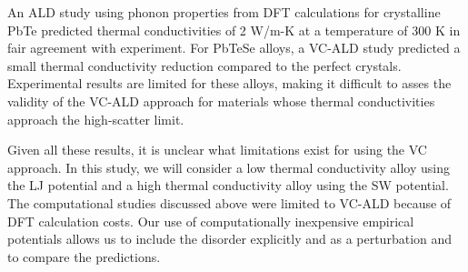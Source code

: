 \documentclass[aps,prb,onecolumn,preprint,footinbib,superscriptaddress,amsmath,amssymb,floatfix]{revtex4}
\begin{document}
An ALD study using phonon properties from DFT calculations for 
crystalline PbTe\cite{shiga_microscopic_2012} predicted 
thermal conductivities of 2 W/m-K at a temperature of 300 K 
in fair agreement with experiment. 
For PbTeSe alloys, a VC-ALD 
study predicted a small thermal conductivity reduction compared to the 
perfect crystals.\cite{tian_phonon_2012} Experimental results are limited 
for these alloys,\cite{kudman_thermoelectric_1972,pei_convergence_2011} 
making it difficult to asses the validity of the VC-ALD approach for 
materials whose thermal conductivities approach the high-scatter limit.

Given all these results, it is unclear what limitations exist for 
using the VC approach. 
In this study, we will consider a low thermal conductivity alloy  
using the LJ potential and a high thermal conductivity alloy using the 
SW potential. The computational studies discussed above were 
limited to VC-ALD 
because of DFT calculation costs. Our use of computationally 
inexpensive empirical potentials allows us to include the disorder 
explicitly and as a perturbation and to compare the predictions. 


\end{document}
